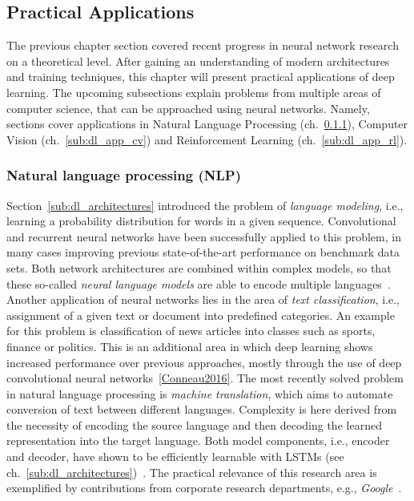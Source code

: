 \subsection{Practical Applications}
\label{sub:dl_applications}

The previous chapter section covered recent progress in neural network research
on a theoretical level.
After gaining an understanding of modern architectures and training techniques,
this chapter will present practical applications of deep learning.
The upcoming subsections explain problems from multiple areas of computer
science, that can be approached using neural networks.
Namely, sections cover applications in Natural Language Processing (ch.~\ref{sub:dl_app_nlp}),
Computer Vision (ch.~\ref{sub:dl_app_cv}) and Reinforcement Learning (ch.~\ref{sub:dl_app_rl}).

\subsubsection{Natural language processing (NLP)}
\label{sub:dl_app_nlp}

Section~\ref{sub:dl_architectures} introduced the problem of \textit{language modeling},
i.e., learning a probability distribution for words in a given sequence.
Convolutional and recurrent neural networks have been successfully applied to
this problem, in many cases improving previous state-of-the-art performance
on benchmark data sets.
Both network architectures are combined within complex models, so that these
so-called \textit{neural language models} are able to encode multiple
languages~\cite{Kim2015}.
Another application of neural networks lies in the area of \textit{text classification},
i.e., assignment of a given text or document into predefined categories.
An example for this problem is classification of news articles into classes such
as sports, finance or politics.
This is an additional area in which deep learning shows increased performance
over previous approaches, mostly through the use of deep convolutional neural
networks~\ref{Conneau2016}.
The most recently solved problem in natural language processing is \textit{machine
translation}, which aims to automate conversion of text between different
languages.
Complexity is here derived from the necessity of encoding the source language and
then decoding the learned representation into the target language.
Both model components, i.e., encoder and decoder, have shown to be efficiently
learnable with LSTMs (see ch.~\ref{sub:dl_architectures})~\cite{Sutskever2014}.
The practical relevance of this research area is exemplified by contributions
from corporate research departments, e.g., \textit{Google}~\cite{Wu2016}.

